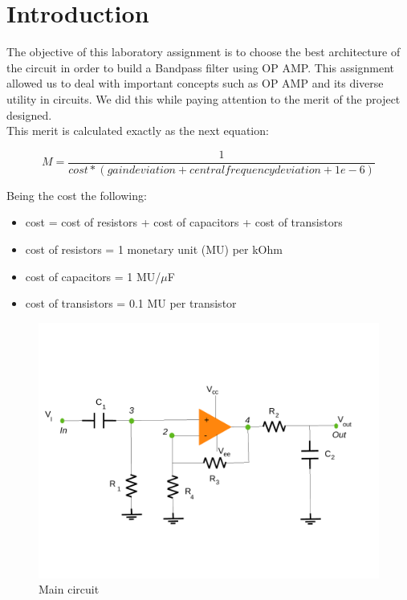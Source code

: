 \newpage
\section{Introduction}
\label{sec:introduction}

The objective of this laboratory assignment is to choose the best architecture of the circuit in order to build a Bandpass filter using OP AMP. This assignment allowed us to deal with important concepts such as OP AMP and its diverse utility in circuits. We did this while paying attention to the merit of the project designed.\\
This merit is calculated exactly as the next equation:

\begin{equation} 
M = \frac{1}{cost * (gain deviation + central frequency deviation + 1e-6)}
\label{eq1}
\end{equation}

Being the cost the following:
\begin{itemize}
	\item cost = cost of resistors  + cost of capacitors + cost of transistors
	\item cost of resistors = 1 monetary unit (MU) per kOhm
	\item cost of capacitors = 1 MU/$\mu$F
	\item cost of transistors = 0.1 MU per transistor
	
\end{itemize}

\begin{figure}[H] 
\centering
\includegraphics[width= 13cm]{circuito5.pdf} 
\caption{Main circuit}
\label{first}
\end{figure}

